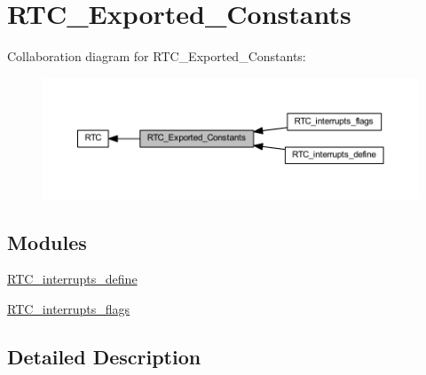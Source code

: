 \hypertarget{group___r_t_c___exported___constants}{}\section{R\+T\+C\+\_\+\+Exported\+\_\+\+Constants}
\label{group___r_t_c___exported___constants}
Collaboration diagram for R\+T\+C\+\_\+\+Exported\+\_\+\+Constants\+:
\nopagebreak
\begin{figure}[H]
\begin{center}
\leavevmode
\includegraphics[width=350pt]{group___r_t_c___exported___constants}
\end{center}
\end{figure}
\subsection*{Modules}
\begin{DoxyCompactItemize}
\item 
\hyperlink{group___r_t_c__interrupts__define}{R\+T\+C\+\_\+interrupts\+\_\+define}
\item 
\hyperlink{group___r_t_c__interrupts__flags}{R\+T\+C\+\_\+interrupts\+\_\+flags}
\end{DoxyCompactItemize}


\subsection{Detailed Description}
